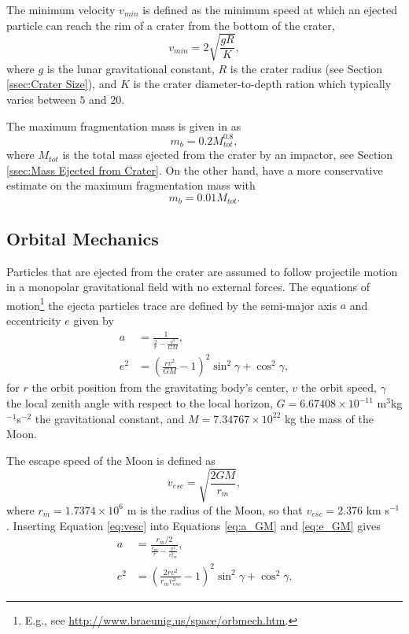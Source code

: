\documentclass{article}
\begin{document}
The minimum velocity $v_{min}$ is defined as the minimum speed at which an ejected particle can reach the rim of a crater from the bottom of the crater,
\begin{equation}
v_{min} = 2\sqrt{\frac{gR}{K}},
\end{equation}
where $g$ is the lunar gravitational constant, $R$ is the crater radius (see Section \ref{ssec:Crater Size}), and $K$ is the crater diameter-to-depth ration which typically varies between $5$ and $20$. 

The maximum fragmentation mass is given in \cite{oKeefe1985impact} as
\begin{equation}
m_b = 0.2 M_{tot}^{0.8},
\end{equation}
where $M_{tot}$ is the total mass ejected from the crater by an impactor, see Section \ref{ssec:Mass Ejected from Crater}. On the other hand, \cite{koschny2001impacts_mass} have a more conservative estimate on the maximum fragmentation mass with
\begin{equation}
m_b = 0.01 M_{tot}.
\end{equation}

\subsection{Orbital Mechanics}\label{ssec:Orbital Mechanics}

Particles that are ejected from the crater are assumed to follow projectile motion in a monopolar gravitational field with no external forces. The equations of motion\footnote{E.g., see \href{http://www.braeunig.us/space/orbmech.htm}{http://www.braeunig.us/space/orbmech.htm}.} the ejecta particles trace are defined by the semi-major axis $a$ and eccentricity $e$ given by
\begin{align}
a &= \frac{1}{\frac{2}{r} - \frac{v^2}{GM}},\label{eq:a_GM}\\
e^2 &= \left(\frac{rv^2}{GM} - 1\right)^2\sin^2\gamma + \cos^2\gamma,\label{eq:e_GM}
\end{align}
for $r$ the orbit position from the gravitating body's center, $v$ the orbit speed, $\gamma$ the local zenith angle with respect to the local horizon, $G = 6.67408\times 10^{-11}$ m$^3$kg$^{-1}$s$^{-2}$ the gravitational constant, and $M = 7.34767\times 10^{22}$ kg the mass of the Moon.

The escape speed of the Moon is defined as
\begin{equation}\label{eq:vesc}
v_{esc} = \sqrt{\frac{2GM}{r_m}},
\end{equation}
where $r_m = 1.7374\times 10^{6}$ m is the radius of the Moon, so that $v_{esc} = 2.376$ km s$^{-1}$. Inserting Equation \eqref{eq:vesc} into Equations \eqref{eq:a_GM} and \eqref{eq:e_GM} gives
\begin{align}
a &= \frac{r_m/2}{\frac{r_m}{r} - \frac{v^2}{v_{esc}^2}},\label{eq:a_vgen}\\
e^2 &= \left(\frac{2rv^2}{r_m v_{esc}^2} - 1\right)^2\sin^2\gamma + \cos^2\gamma.\label{eq:e_vgen}
\end{align}
\end{document}
